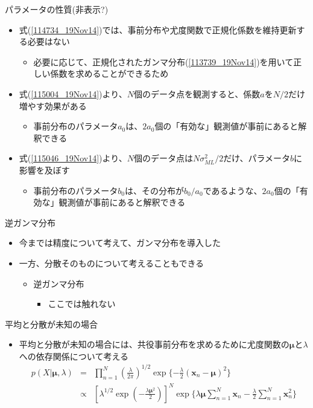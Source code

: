 \begin{frame}{パラメータの性質(非表示?)}
 \begin{itemize}
  \item 式(\ref{114734_19Nov14})では、事前分布や尤度関数で正規化係数を維持更新する必要はない
        \begin{itemize}
         \item 必要に応じて、正規化されたガンマ分布(\ref{113739_19Nov14})を用いて正しい係数を求めることができるため
        \end{itemize}
  \item 式(\ref{115004_19Nov14})より、$N$個のデータ点を観測すると、係数$a$を$N/2$だけ増やす効果がある
        \begin{itemize}
         \item 事前分布のパラメータ$a_0$は、$2a_0$個の「有効な」観測値が事前にあると解釈できる
        \end{itemize}
  \item 式(\ref{115046_19Nov14})より、$N$個のデータ点は$N\sigma_{ML}^2/2$だけ、パラメータ$b$に影響を及ぼす
        \begin{itemize}
         \item 事前分布のパラメータ$b_0$は、その分布が$b_0/a_0$であるような、$2a_0$個の「有効な」観測値が事前にあると解釈できる
        \end{itemize}
 \end{itemize}
\end{frame}

\begin{frame}{逆ガンマ分布}
 \begin{itemize}
  \item 今までは精度について考えて、ガンマ分布を導入した
  \item 一方、分散そのものについて考えることもできる
        \begin{itemize}
         \item \alert{逆ガンマ分布}
               \begin{itemize}
                \item ここでは触れない
               \end{itemize}
        \end{itemize}
 \end{itemize}
\end{frame}

\begin{frame}{平均と分散が未知の場合}
 \begin{itemize}
  \item \alert{平均と分散が未知}の場合には、共役事前分布を求めるために尤度関数の$\bm{\mu}$と$\lambda$への依存関係について考える
        \begin{eqnarray}
         p(X|\bm{\mu},\lambda) &=& \prod_{n=1}^{N}(\frac{\lambda}{2\pi})^{1/2}\exp\{-\frac{\lambda}{2}(\bm{x}_n-\bm{\mu})^2\} \nonumber \\
         &\propto & [\lambda^{1/2}\exp(-\frac{\lambda\bm{\mu}^2}{2})]^{N}\exp\{\lambda\bm{\mu}\sum_{n=1}^{N}\bm{x}_n-\frac{\lambda}{2}\sum_{n=1}^{N}\bm{x}_n^2\}
        \end{eqnarray}
 \end{itemize}
\end{frame}

